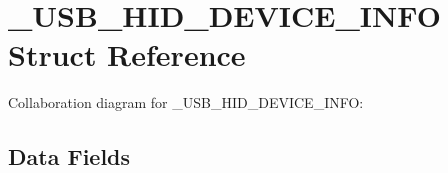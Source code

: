 \hypertarget{struct___u_s_b___h_i_d___d_e_v_i_c_e___i_n_f_o}{}\section{\+\_\+\+U\+S\+B\+\_\+\+H\+I\+D\+\_\+\+D\+E\+V\+I\+C\+E\+\_\+\+I\+N\+F\+O Struct Reference}
\label{struct___u_s_b___h_i_d___d_e_v_i_c_e___i_n_f_o}


Collaboration diagram for \+\_\+\+U\+S\+B\+\_\+\+H\+I\+D\+\_\+\+D\+E\+V\+I\+C\+E\+\_\+\+I\+N\+F\+O\+:
\subsection*{Data Fields}
